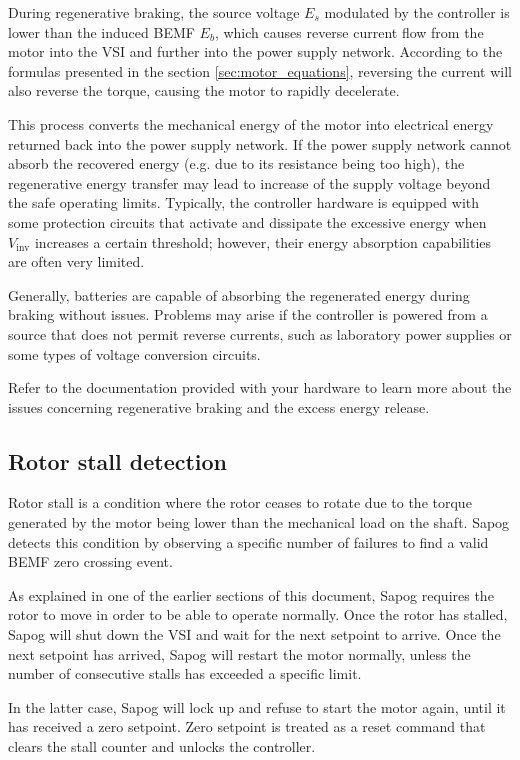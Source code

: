 \documentclass{zubaxdoc}
\begin{document}
During regenerative braking, the source voltage $E_s$ modulated by the controller is lower than the
induced BEMF $E_b$, which causes reverse current flow from the motor into the VSI
and further into the power supply network.
According to the formulas presented in the section \ref{sec:motor_equations},
reversing the current will also reverse the torque, causing the motor to rapidly decelerate.

This process converts the mechanical energy of the motor into electrical energy returned back into the
power supply network.
If the power supply network cannot absorb the recovered energy (e.g. due to its resistance being too high),
the regenerative energy transfer may lead to increase of the supply voltage beyond the safe operating limits.
Typically, the controller hardware is equipped with some protection circuits that activate and dissipate the
excessive energy when $V_\text{inv}$ increases a certain threshold;
however, their energy absorption capabilities are often very  limited.

Generally, batteries are capable of absorbing the regenerated energy during braking without issues.
Problems may arise if the controller is powered from a source that does not permit reverse currents,
such as laboratory power supplies or some types of voltage conversion circuits.

Refer to the documentation provided with your hardware to learn more about the issues
concerning regenerative braking and the excess energy release.

\subsection{Rotor stall detection}

Rotor stall is a condition where the rotor ceases to rotate due to the torque generated by the motor
being lower than the mechanical load on the shaft.
Sapog detects this condition by observing a specific number of failures to find
a valid BEMF zero crossing event.

As explained in one of the earlier sections of this document,
Sapog requires the rotor to move in order to be able to operate normally.
Once the rotor has stalled, Sapog will shut down the VSI and wait for the next setpoint to arrive.
Once the next setpoint has arrived, Sapog will restart the motor normally,
unless the number of consecutive stalls has exceeded a specific limit.

In the latter case, Sapog will lock up and refuse to start the motor again,
until it has received a zero setpoint.
Zero setpoint is treated as a reset command that clears the stall counter and unlocks the controller.
\end{document}
